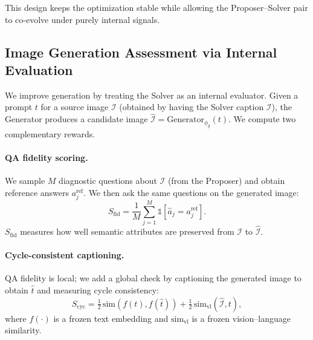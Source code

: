 This design keeps the optimization stable while allowing the Proposer--Solver pair to co-evolve under purely internal signals.


\subsection{Image Generation Assessment via Internal Evaluation}
\label{sec:generation}

We improve generation by treating the Solver as an internal evaluator. Given a prompt $t$ for a source image $\mathcal{I}$ (obtained by having the Solver caption $\mathcal{I}$), the Generator produces a candidate image $\hat{\mathcal{I}}=\text{Generator}_{\phi_g}(t)$. We compute two complementary rewards.

\paragraph{QA fidelity scoring.}
We sample $M$ diagnostic questions about $\mathcal{I}$ (from the Proposer) and obtain reference answers $a_j^{\text{ref}}$. We then ask the same questions on the generated image:
\begin{equation}
    S_{\text{fid}} = \frac{1}{M} \sum_{j=1}^{M} \mathbb{1}[\hat{a}_j = a^{\text{ref}}_j].
    \label{eq:fidelity}
\end{equation}
$S_{\text{fid}}$ measures how well semantic attributes are preserved from $\mathcal{I}$ to $\hat{\mathcal{I}}$.

\paragraph{Cycle-consistent captioning.}
QA fidelity is local; we add a global check by captioning the generated image to obtain $\hat{t}$ and measuring cycle consistency:
\begin{equation}
    S_{\text{cyc}} = \tfrac{1}{2}\,\text{sim}(f(t), f(\hat{t})) + \tfrac{1}{2}\,\text{sim}_{\text{vl}}(\hat{\mathcal{I}}, t),
    \label{eq:cycle}
\end{equation}
where $f(\cdot)$ is a frozen text embedding and $\text{sim}_{\text{vl}}$ is a frozen vision--language similarity.

